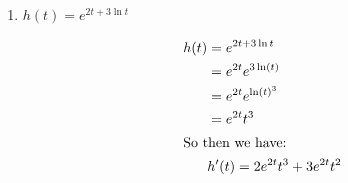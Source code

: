 \documentclass{article}
\begin{document}
\begin{enumerate}
\begin{enumerate}
  \item
    \begin{problem}[\stretch{0.25}]
      $h(t) = e^{2t + 3 \ln t}$
    \end{problem}

    \begin{solution}
        \begin{align*}
            h(t) &= e^{2t + 3 \ln t} \\
            & = e^{2t}e^{3\ln(t)} \\
            & = e^{2t}e^{\ln(t)^3} \\
            & = e^{2t}t^3 \\
            \intertext{So then we have:} 
           & h'(t) = 2e^{2t}t^3 + 3e^{2t}t^2 \\
        \end{align*}
    \end{solution}

  \end{enumerate}

\end{enumerate}
\end{document}

